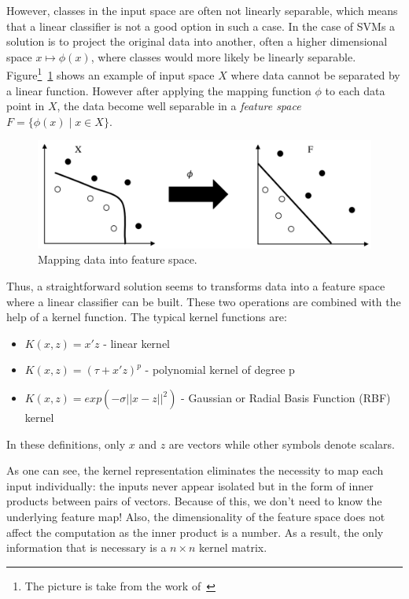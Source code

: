 However, classes in the input space are often not linearly separable, which means that a linear classifier is not a good option in such a case. In the case of SVMs a solution is to project the original data into another, often a higher dimensional space \(x \mapsto \phi(x) \), where classes would more likely be linearly separable. Figure\footnote{The picture is take from the work of~\cite{Okun;Valentini:2009}}~\ref{fig:hyperplane2} shows an example of input space \(X\) where data cannot be separated by a linear function. However after applying the mapping function \(\phi\) to each data point in \(X\), the data become well separable in a \textit{feature space} \(F = \{ \phi(x)\; | \; x \in X\}\).
\begin{figure}[h!]
    \centering
    \includegraphics[scale=0.6]{Graphics/svp-separation.png}
    \caption{Mapping data into feature space.}
    \label{fig:hyperplane2}
\end{figure}

Thus, a straightforward solution seems to transforms data into a feature space where a linear classifier can be built. These two operations are combined with the help of a kernel function. The typical kernel functions are:
\begin{itemize}
            \item \(K(x,z) = x'z \) - linear kernel
            \item \(K(x,z) = (\tau + x'z)^p\) - polynomial kernel of degree p
            \item \(K(x,z) = exp(-\sigma||x-z||^2)\) - Gaussian or Radial Basis Function (RBF) kernel
\end{itemize}

In these definitions, only $x$ and $z$ are vectors while other symbols denote scalars.

As one can see, the kernel representation eliminates the necessity to map each input individually: the inputs never appear isolated but in the form of inner products between pairs of vectors. Because of this, we don't need to know the underlying feature map! Also, the dimensionality of the feature space does not affect the computation as the inner product is a number. As a result, the only information that is necessary is a \(n\times n\) kernel matrix.

